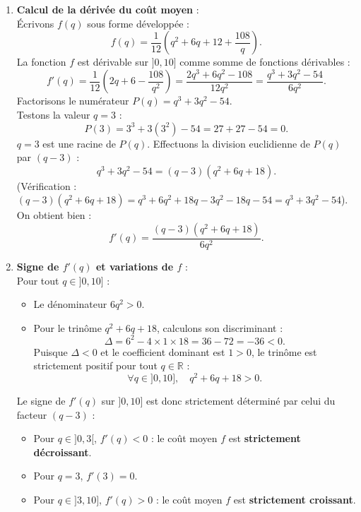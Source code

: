 \documentclass[11pt,a4paper]{article}
\newcommand{\R}{\mathbb{R}}
\begin{document}
\begin{correctionbox}
\begin{enumerate}[label=\textbf{\arabic*.}]
    \item \textbf{Calcul de la dérivée du coût moyen} :\\
    Écrivons $f(q)$ sous forme développée :
    \[
    f(q) = \frac{1}{12}\left(q^2 + 6q + 12 + \frac{108}{q}\right).
    \]
    La fonction $f$ est dérivable sur $]0, 10]$ comme somme de fonctions dérivables :
    \[
    f'(q) = \frac{1}{12}\left(2q + 6 - \frac{108}{q^2}\right) = \frac{2q^3 + 6q^2 - 108}{12q^2} = \frac{q^3 + 3q^2 - 54}{6q^2}.
    \]
    Factorisons le numérateur $P(q) = q^3 + 3q^2 - 54$.\\
    Testons la valeur $q = 3$ :
    \[
    P(3) = 3^3 + 3(3^2) - 54 = 27 + 27 - 54 = 0.
    \]
    $q = 3$ est une racine de $P(q)$. Effectuons la division euclidienne de $P(q)$ par $(q - 3)$ :
    \[
    q^3 + 3q^2 - 54 = (q - 3)(q^2 + 6q + 18).
    \]
    (Vérification : $(q-3)(q^2+6q+18) = q^3 + 6q^2 + 18q - 3q^2 - 18q - 54 = q^3 + 3q^2 - 54$).\\
    On obtient bien :
    \[
    f'(q) = \frac{(q - 3)(q^2 + 6q + 18)}{6q^2}.
    \]

    \item \textbf{Signe de $f'(q)$ et variations de $f$} :\\
    Pour tout $q \in ]0, 10]$ :
    \begin{itemize}
        \item Le dénominateur $6q^2 > 0$.
        \item Pour le trinôme $q^2 + 6q + 18$, calculons son discriminant :
        \[
        \Delta = 6^2 - 4 \times 1 \times 18 = 36 - 72 = -36 < 0.
        \]
        Puisque $\Delta < 0$ et le coefficient dominant est $1 > 0$, le trinôme est strictement positif pour tout $q \in \R$ :
        \[
        \forall q \in ]0, 10], \quad q^2 + 6q + 18 > 0.
        \]
    \end{itemize}
    Le signe de $f'(q)$ sur $]0, 10]$ est donc strictement déterminé par celui du facteur $(q - 3)$ :
    \begin{itemize}
        \item Pour $q \in ]0, 3[$, $f'(q) < 0$ : le coût moyen $f$ est \textbf{strictement décroissant}.
        \item Pour $q = 3$, $f'(3) = 0$.
        \item Pour $q \in ]3, 10]$, $f'(q) > 0$ : le coût moyen $f$ est \textbf{strictement croissant}.
    \end{itemize}


\end{enumerate}
\end{correctionbox}
\end{document}
